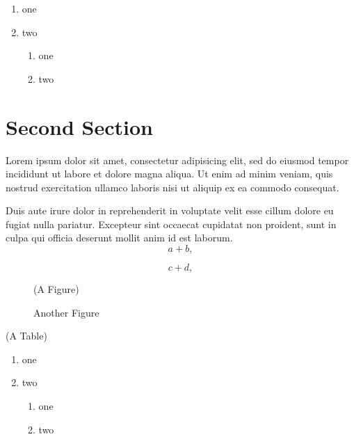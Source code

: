\documentclass{report}
\begin{document}
\begin{enumerate}
 \item one
 \item two
   \begin{enumerate}
    \item one
    \item two
   \end{enumerate}
\end{enumerate}


\section{Second Section}
Lorem ipsum dolor sit amet, consectetur adipisicing elit, sed do eiusmod tempor incididunt ut labore et dolore magna aliqua. Ut enim ad minim veniam, quis nostrud exercitation ullamco laboris nisi ut aliquip ex ea commodo consequat.

Duis aute irure dolor in reprehenderit in voluptate velit esse cillum dolore eu fugiat nulla pariatur. Excepteur sint occaecat cupidatat non proident, sunt in culpa qui officia deserunt mollit anim id est laborum.
\begin{equation}
 a + b,
\end{equation}

\begin{equation}
 c + d,
\end{equation}

\begin{figure}
(A Figure)
\caption{Another Figure}
\end{figure}

\begin{table}
(A Table)
\caption{Another Table}
\end{table}

\begin{enumerate}
 \item one
 \item two
   \begin{enumerate}
    \item one
    \item two
   \end{enumerate}
\end{enumerate}
\end{document}
